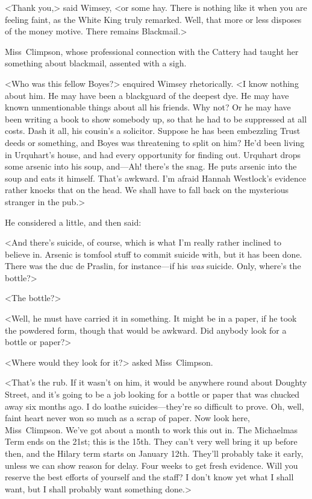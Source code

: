 <Thank you,> said Wimsey, <or some hay. There is nothing like it when you are feeling faint, as the White King truly remarked. Well, that more or less disposes of the money motive. There remains Blackmail.>

Miss~Climpson, whose professional connection with the Cattery had taught her something about blackmail, assented with a sigh.

<Who was this fellow Boyes?> enquired Wimsey rhetorically. <I know nothing about him. He may have been a blackguard of the deepest dye. He may have known unmentionable things about all his friends. Why not? Or he may have been writing a book to show somebody up, so that he had to be suppressed at all costs. Dash it all, his cousin's a solicitor. Suppose he has been embezzling Trust deeds or something, and Boyes was threatening to split on him? He'd been living in Urquhart's house, and had every opportunity for finding out. Urquhart drops some arsenic into his soup, and—Ah! there's the snag. He puts arsenic into the soup and eats it himself. That's awkward. I'm afraid Hannah Westlock's evidence rather knocks that on the head. We shall have to fall back on the mysterious stranger in the pub.>

He considered a little, and then said:

<And there's suicide, of course, which is what I'm really rather inclined to believe in. Arsenic is tomfool stuff to commit suicide with, but it has been done. There was the duc de Praslin, for instance—if his \emph{was} suicide. Only, where's the bottle?>

<The bottle?>

<Well, he must have carried it in something. It might be in a paper, if he took the powdered form, though that would be awkward. Did anybody look for a bottle or paper?>

<Where would they look for it?> asked Miss~Climpson.

<That's the rub. If it wasn't on him, it would be anywhere round about Doughty Street, and it's going to be a job looking for a bottle or paper that was chucked away six months ago. I do loathe suicides—they're so difficult to prove. Oh, well, faint heart never won so much as a scrap of paper. Now look here, Miss~Climpson. We've got about a month to work this out in. The Michaelmas Term ends on the 21st; this is the 15th. They can't very well bring it up before then, and the Hilary term starts on January 12th. They'll probably take it early, unless we can show reason for delay. Four weeks to get fresh evidence. Will you reserve the best efforts of yourself and the staff? I don't know yet what I shall want, but I shall probably want something done.>

